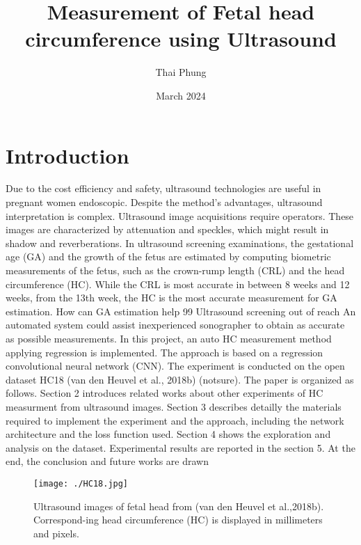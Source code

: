 \documentclass{article}
\title{Measurement of Fetal head circumference using Ultrasound}
\author{Thai Phung}
\date{March 2024}
\begin{document}
\maketitle

\section{Introduction}

Due to the cost efficiency and safety, ultrasound technologies are useful in pregnant women endoscopic.  Despite the method’s advantages, ultrasound interpretation is complex. Ultrasound image acquisitions require operators. These images are characterized by attenuation and speckles, which might result in shadow and reverberations. 
In ultrasound screening examinations, the gestational age (GA) and the growth of the fetus are estimated by computing biometric measurements of the fetus, such as the crown-rump length (CRL) and the head circumference (HC). While the CRL is most accurate in between 8 weeks and 12 weeks, from the 13th week, the HC is the most accurate measurement for GA estimation. 
How can GA  estimation help 
99%
Ultrasound screening out of reach
An automated system could assist inexperienced sonographer to obtain as accurate as possible measurements. 
In this project, an auto HC measurement method applying regression is implemented. The approach is based on a regression convolutional neural network (CNN). The experiment is conducted on the open dataset HC18 (van den Heuvel et al., 2018b) (notsure). The paper is organized as follows. Section 2 introduces related works about other experiments of HC measurment from ultrasound images. Section 3 describes detailly the materials required to implement the experiment and the approach, including the network architecture and the loss function used. Section 4 shows the exploration and analysis on the dataset. Experimental results are reported in the section 5. At the end, the conclusion and future works are drawn


\begin{figure}[h]
    \centering
    \begin{minipage}{0.45\textwidth}
        \centering
        \texttt{[image: ./HC18.jpg]}
        \caption{Ultrasound images of fetal head from (van den Heuvel et al.,2018b). Correspond-ing head circumference (HC) is displayed in millimeters and pixels.}
        \label{fig:Class Distribution}
    \end{minipage}\hfill
\end{figure}
\end{document}
